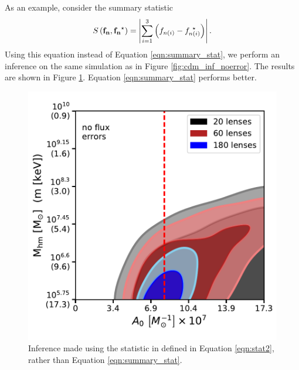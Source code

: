 As an example, consider the summary statistic
\begin{equation}
\label{eqn:stat2}
S \left({\bf{f_n}},{\bf{f_n}^{\star}} \right) = \left| \sum_{i=1}^{3} \left({f_{n\left(i\right)}} - {f_{n\left(i\right)}^{\ \star}}\right) \right| .
\end{equation} 
Using this equation instead of Equation \ref{eqn:summary_stat}, we perform an inference on the same simulation as in Figure \ref{fig:cdm_inf_noerror}. The results are shown in Figure \ref{fig:other_stat}. Equation \ref{eqn:summary_stat} performs better. 

\begin{figure}
	\centering
	\includegraphics[clip,trim=.15cm .5cm 0cm
	0cm,width=.75\textwidth,keepaspectratio]{./figures_ABCforward/joint_varynlens_noerrors_otherstat.pdf}
	\caption[Inference on mock data from alternative summary statistics]{\label{fig:other_stat} Inference made using the statistic in defined in Equation \ref{eqn:stat2}, rather than Equation \ref{eqn:summary_stat}.}
\end{figure} 

